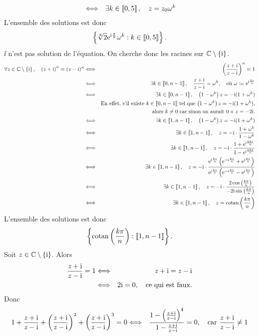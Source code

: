 \documentclass{magnolia}
\begin{document}
\begin{sol}
\begin{questions}
\begin{eqnarray*}
&\Longleftrightarrow& \exists k\in\left\llbracket 0,5\right\rrbracket,\quad z=z_0 \omega^k
  \end{eqnarray*}
  L'ensemble des solutions est donc
\[\left\{\sqrt[6]{2}{\rm e}^{{\rm i}\frac{\pi}{9}}\omega^k : k\in\left\llbracket 0,5\right\rrbracket\right\}.\]
\question $\ii$ n'est pas solution de l'équation. On cherche donc les racines sur $\mathbb{C}\setminus\left\{{\rm i}\right\}$.
\begin{eqnarray*}
\forall z\in\mathbb{C}\setminus\left\{{\rm i}\right\},\quad \left(z+{\rm i}\right)^n=(z-{\rm i})^{n}
&\Longleftrightarrow& \left(\frac{z+{\rm i}}{z-{\rm i}}\right)^n=1\\
&\Longleftrightarrow& \exists k\in\left\llbracket 0,n-1\right\rrbracket,\quad \frac{z+{\rm i}}{z-{\rm i}}=\omega^k, \quad\text{où $\omega\coloneqq{\rm e}^{{\rm i}\frac{2\pi}{n}}$}\\
&\Longleftrightarrow& \exists k\in\left\llbracket 0,n-1\right\rrbracket,\quad \left(1-\omega^k\right)z=-{\rm i}(1+\omega^k)\\
&    & \text{En effet, s'il existe $k\in\left\llbracket 0,n-1\right\rrbracket$ tel que $\left(1-\omega^k\right)z=-{\rm i}(1+\omega^k)$,}\\
&    & \text{alors $k\neq 0$ car sinon on aurait $0\times z=-2{\rm i}$.}\\
&\Longleftrightarrow& \exists k\in\left\llbracket 1,n-1\right\rrbracket,\quad \left(1-\omega^k\right)z=-{\rm i}(1+\omega^k)\\
&\Longleftrightarrow& \exists k\in\left\llbracket 1,n-1\right\rrbracket,\quad z=-{\rm i}\cdot\frac{1+\omega^k}{1-\omega^k}\\
&\Longleftrightarrow& \exists k\in\left\llbracket 1,n-1\right\rrbracket,\quad z=-{\rm i}\cdot\frac{1+{\rm e}^{{\rm i}\frac{k2\pi}{n}}}{1-{\rm e}^{{\rm i}\frac{k2\pi}{n}}}\\
&\Longleftrightarrow& \exists k\in\left\llbracket 1,n-1\right\rrbracket,\quad z=-{\rm i}\cdot\frac{{\rm e}^{{\rm i}\frac{k\pi}{n}}\left({\rm e}^{-{\rm i}\frac{k\pi}{n}}+{\rm e}^{{\rm i}\frac{k\pi}{n}}\right)}{{\rm e}^{{\rm i}\frac{k\pi}{n}}\left({\rm e}^{-{\rm i}\frac{k\pi}{n}}-{\rm e}^{{\rm i}\frac{k\pi}{n}}\right)}\\
&\Longleftrightarrow& \exists k\in\left\llbracket 1,n-1\right\rrbracket,\quad z=-{\rm i}\cdot\frac{2\cos\left(\frac{k\pi}{n}\right)}{-2{\rm i}\sin\left(\frac{k\pi}{n}\right)}\\
&\Longleftrightarrow& \exists k\in\left\llbracket 1,n-1\right\rrbracket,\quad z=\operatorname{cotan}\left(\frac{k\pi}{n}\right)
\end{eqnarray*}
L'ensemble des solutions est donc
\[\left\{\operatorname{cotan}\left(\frac{k\pi}{n}\right) : \left\llbracket 1,n-1\right\rrbracket\right\}.\]
\question Soit $z\in\mathbb{C}\setminus\left\{{\rm i}\right\}$. Alors
  \begin{eqnarray*}
  \frac{z+{\rm i}}{z-{\rm i}}=1
  &\Longleftrightarrow& z+{\rm i}=z-{\rm i}\\
  &\Longleftrightarrow& 2{\rm i}=0, \quad\text{ce qui est faux.}
  \end{eqnarray*}
  Donc
  \begin{eqnarray*}
  1+\frac{z+\ii}{z-\ii}+\p{\frac{z+\ii}{z-\ii}}^2+\p{\frac{z+\ii}{z-\ii}}^3=0
  &\ssi& \frac{1-\p{\frac{z+\ii}{z-\ii}}^4}{1-\frac{z+\ii}{z-\ii}}=0, \quad\text{car $\dfrac{z+\ii}{z-\ii}\neq 1$}\\

\end{eqnarray*}
\end{questions}
\end{sol}
\end{document}

